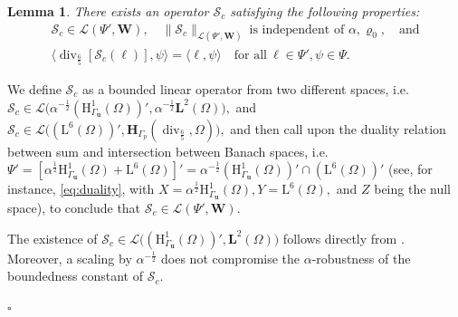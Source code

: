 \documentclass[11pt, reqno, a4paper, twoside]{article}
\newcommand{\bu}{\boldsymbol{u}}
\newcommand{\rH}{\mathrm{H}}
\newcommand{\rL}{\mathrm{L}}
\newcommand{\bH}{\mathbf{H}}
\newcommand{\bL}{\mathbf{L}}
\newcommand{\bW}{\mathbf{W}}
\newcommand{\cL}{\mathcal{L}}
\newcommand{\cS}{\mathcal{S}}
\newcommand\vdiv{\mathop{\mathrm{div}}\nolimits}
\newtheorem{lemma}[theorem]{Lemma}
\newenvironment{proof}{\noindent{\it Proof.}}{\hfill$\square$}
\numberwithin{equation}{section}
\numberwithin{remark}{section}
\numberwithin{figure}{section}
\numberwithin{table}{section}
\begin{document}
{\begin{lemma}\label{lem:inf-sup:ARD}
   There exists an operator \(\cS_c\) satisfying the following properties:
    \begin{gather}\nonumber
    \cS_c \in \cL(\Psi', \bW),\quad 
    \|\cS_c\|_{\cL(\Psi', \bW)}\ \text{is independent of } \alpha,{\varrho_0},\quad \text{and}\\
    {{\langle{\vdiv}_{\frac65} [\cS_c(\ell)], \psi\rangle}} = \langle \ell, \psi \rangle \quad \text{for all}\ \ell \in \Psi',\psi \in \Psi.\label{S:prop}
\end{gather}

\end{lemma}
\begin{proof}
We   define $\cS_c$ as a bounded linear operator from two different spaces, i.e. \(\cS_c\in\cL\bigl(\alpha^{-\frac12}(\rH^1_{\Gamma_{\bu}}(\Omega))',\alpha^{-\frac12}\bL^2(\Omega)\bigr),\) and \(\cS_c\in\cL\bigl((\rL^6(\Omega))',\bH_{\Gamma_p}(\vdiv_{\frac65},\Omega)\bigr),\) and then call upon the duality relation between sum and intersection between Banach spaces, i.e. \(\Psi'=[\alpha^{\frac12}\rH^1_{\Gamma_{\bu}}(\Omega)+\rL^6(\Omega)]'=\alpha^{-\frac12}(\rH^1_{\Gamma_{\bu}}(\Omega))'\cap(\rL^6(\Omega))'\) (see, for instance,  \eqref{eq:duality}, with \(X=\alpha^{\frac12}\rH^1_{\Gamma_{\bu}}(\Omega), Y=\rL^6(\Omega),\) and \(Z\) being the null space), to conclude that \( \cS_c \in {\cL}(\Psi', \bW) \).

The existence of \(\cS_c\in\cL\bigl((\rH^1_{\Gamma_{\bu}}(\Omega))',\bL^2(\Omega)\bigr)\)
follows directly from \cite[Lemma~3.2]{dhpr_sinum26}. Moreover, a scaling by \(\alpha^{-\frac12}\) does not compromise the \(\alpha\)-robustness of the boundedness constant of \(\cS_c.\) 


\end{proof}}
\end{document}
